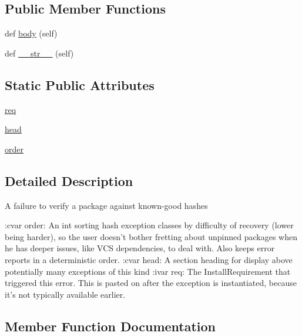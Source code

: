 \subsection*{Public Member Functions}
\begin{DoxyCompactItemize}
\item 
def \hyperlink{classpip_1_1__internal_1_1exceptions_1_1HashError_a9b89535522b4de9758f62636848d4f62}{body} (self)
\item 
def \hyperlink{classpip_1_1__internal_1_1exceptions_1_1HashError_ad5c0add04540a93dee3301a7d5f792a9}{\+\_\+\+\_\+str\+\_\+\+\_\+} (self)
\end{DoxyCompactItemize}
\subsection*{Static Public Attributes}
\begin{DoxyCompactItemize}
\item 
\hyperlink{classpip_1_1__internal_1_1exceptions_1_1HashError_af3c50ea4f7da6636a64b938cda7052c9}{req}
\item 
\hyperlink{classpip_1_1__internal_1_1exceptions_1_1HashError_a8dc528f839ced7bff0f8909445b48b1b}{head}
\item 
\hyperlink{classpip_1_1__internal_1_1exceptions_1_1HashError_a9ffcc2f77a2f4a1cf096084d187b7045}{order}
\end{DoxyCompactItemize}


\subsection{Detailed Description}
\begin{DoxyVerb}A failure to verify a package against known-good hashes

:cvar order: An int sorting hash exception classes by difficulty of
    recovery (lower being harder), so the user doesn't bother fretting
    about unpinned packages when he has deeper issues, like VCS
    dependencies, to deal with. Also keeps error reports in a
    deterministic order.
:cvar head: A section heading for display above potentially many
    exceptions of this kind
:ivar req: The InstallRequirement that triggered this error. This is
    pasted on after the exception is instantiated, because it's not
    typically available earlier.\end{DoxyVerb}
 

\subsection{Member Function Documentation}
\mbox{\label{classpip_1_1__internal_1_1exceptions_1_1HashError_ad5c0add04540a93dee3301a7d5f792a9}} 
